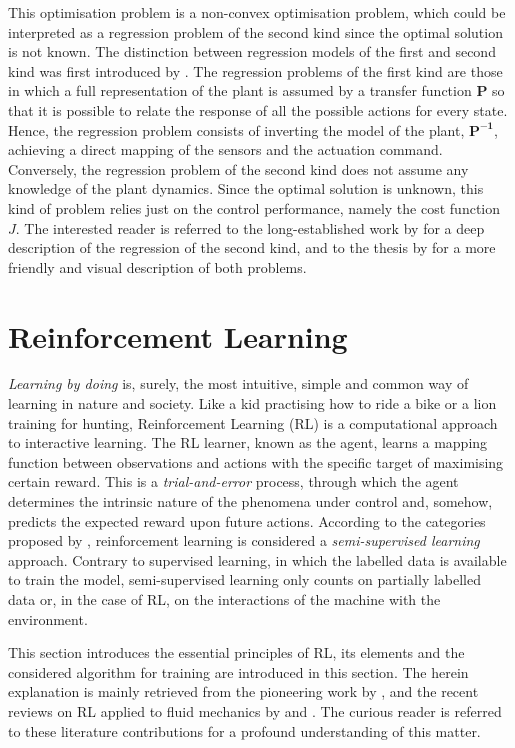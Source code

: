 This optimisation problem is a non-convex optimisation problem, which could be interpreted as a regression problem of the second kind since the optimal solution is not known. The distinction between regression models of the first and second kind was first introduced by \citet{Fisk1967reg}. The regression problems of the first kind are those in which a full representation of the plant is assumed by a transfer function $\bm{P}$ so that it is possible to relate the response of all the possible actions for every state. Hence, the regression problem consists of inverting the model of the plant, $\bm{P^{-1}}$, achieving a direct mapping of the sensors and the actuation command. Conversely, the regression problem of the second kind does not assume any knowledge of the plant dynamics. Since the optimal solution is unknown, this kind of problem relies just on the control performance, namely the cost function $J$. The interested reader is referred to the long-established work by \citet{Fisk1967reg} for a deep description of the regression of the second kind, and to the thesis by \citet{cornejomacedaPhD} for a more friendly and visual description of both problems.

\section{Reinforcement Learning}

\textit{Learning by doing} is, surely, the most intuitive, simple and common way of learning in nature and society. Like a kid practising how to ride a bike or a lion training for hunting, Reinforcement Learning (RL) is a computational approach to interactive learning. The RL learner, known as the agent, learns a mapping function between observations and actions with the specific target of maximising certain reward. This is a \textit{trial-and-error} process, through which the agent determines the intrinsic nature of the phenomena under control and, somehow, predicts the expected reward upon future actions. According to the categories proposed by \citet{BruntonNoackKoumoutsakos2020}, reinforcement learning is considered a \textit{semi-supervised learning} approach. Contrary to supervised learning, in which the labelled data is available to train the model, semi-supervised learning only counts on partially labelled data or, in the case of RL, on the interactions of the machine with the environment.  

This section introduces the essential principles of RL, its elements and the considered algorithm for training are introduced in this section. The herein explanation is mainly retrieved from the pioneering work by \citet{sutton2018reinforcement}, and the recent reviews on RL applied to fluid mechanics by \citet{Garnier2021RLrev} and \citet{Viquerat2021RLrev}. The curious reader is referred to these literature contributions for a profound understanding of this matter.

